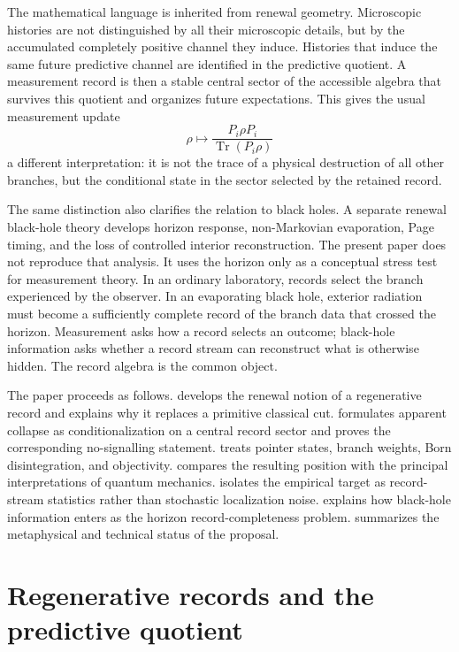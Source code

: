 \documentclass[11pt]{article}
\numberwithin{equation}{section}
\theoremstyle{definition}
\theoremstyle{remark}
\newcommand{\Tr}{\operatorname{Tr}}
\begin{document}
The mathematical language is inherited from renewal geometry.  Microscopic histories are not distinguished by all their microscopic details, but by the accumulated completely positive channel they induce.  Histories that induce the same future predictive channel are identified in the predictive quotient.  A measurement record is then a stable central sector of the accessible algebra that survives this quotient and organizes future expectations.  This gives the usual measurement update
\[
  \rho \longmapsto \frac{P_i\rho P_i}{\Tr(P_i\rho)}
\]
a different interpretation: it is not the trace of a physical destruction of all other branches, but the conditional state in the sector selected by the retained record.

The same distinction also clarifies the relation to black holes.  A separate renewal black-hole theory develops horizon response, non-Markovian evaporation, Page timing, and the loss of controlled interior reconstruction.  The present paper does not reproduce that analysis.  It uses the horizon only as a conceptual stress test for measurement theory.  In an ordinary laboratory, records select the branch experienced by the observer.  In an evaporating black hole, exterior radiation must become a sufficiently complete record of the branch data that crossed the horizon.  Measurement asks how a record selects an outcome; black-hole information asks whether a record stream can reconstruct what is otherwise hidden.  The record algebra is the common object.

The paper proceeds as follows.   develops the renewal notion of a regenerative record and explains why it replaces a primitive classical cut.   formulates apparent collapse as conditionalization on a central record sector and proves the corresponding no-signalling statement.   treats pointer states, branch weights, Born disintegration, and objectivity.   compares the resulting position with the principal interpretations of quantum mechanics.   isolates the empirical target as record-stream statistics rather than stochastic localization noise.   explains how black-hole information enters as the horizon record-completeness problem.   summarizes the metaphysical and technical status of the proposal.

\section{Regenerative records and the predictive quotient}
\label{sec:renewal-records}
\end{document}
